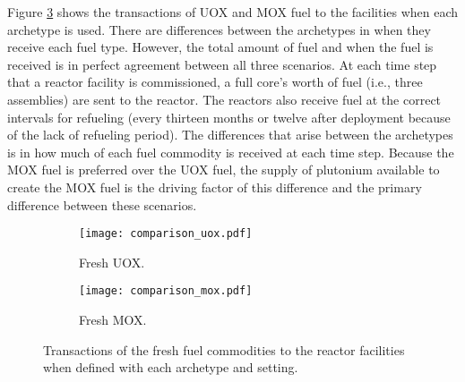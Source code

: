 Figure \ref{fig:comparison_fuel} shows the transactions of UOX and 
MOX fuel to the facilities when each archetype is used. There are 
differences between the archetypes in when they receive each fuel type. 
However, the total amount of fuel and when the fuel is received is in 
perfect agreement between all three scenarios. At each time step that 
a reactor facility is commissioned, a full core's worth of fuel (i.e., 
three assemblies) are sent to the reactor. The reactors also receive fuel 
at the correct intervals for refueling (every thirteen months or twelve 
after deployment because of the lack of refueling period). The differences 
that arise between the archetypes is in how much of each fuel commodity 
is received at each time step. Because the \gls{MOX} fuel is preferred 
over the \gls{UOX} fuel, the supply of plutonium available to create the 
\gls{MOX} fuel is the driving factor of this difference and the primary 
difference between these scenarios. 

\begin{figure}
    \centering
    \begin{subfigure}[b]{0.48\textwidth}
        \centering
        \texttt{[image: comparison\_uox.pdf]}
        \caption{Fresh UOX.}
        \label{fig:comparison_uox}
    \end{subfigure}
    \hfill
    \begin{subfigure}[b]{0.48\textwidth}
        \centering
        \texttt{[image: comparison\_mox.pdf]}
        \caption{Fresh MOX.}
        \label{fig:comparison_mox}
    \end{subfigure}
       \caption{Transactions of the fresh fuel commodities to the 
       reactor facilities when defined with each archetype and 
       setting.}
       \label{fig:comparison_fuel}
\end{figure}

